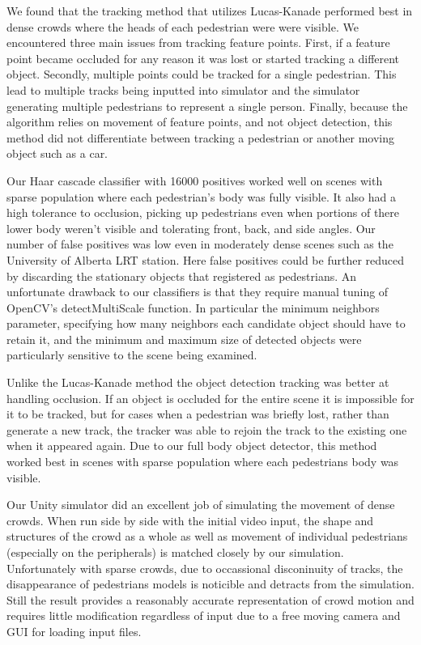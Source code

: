 \documentclass[12pt, onecolumn, conference]{IEEEtran}
\begin{document}
We found that the tracking method that utilizes Lucas-Kanade performed best in dense crowds where the heads of each pedestrian were were visible. We encountered three main issues from tracking feature points. First, if a feature point became occluded for any reason it was lost or started tracking a different object. Secondly, multiple points could be tracked for a single pedestrian. This lead to multiple tracks being inputted into simulator and the simulator generating multiple pedestrians to represent a single person. Finally, because the algorithm relies on movement of feature points, and not object detection, this method did not differentiate between tracking a pedestrian or  another moving object such as a car.

Our Haar cascade classifier with 16000 positives worked well on scenes with sparse population where each pedestrian's body was fully visible. It also had a high tolerance to occlusion, picking up pedestrians even when portions of there lower body weren't visible and tolerating front, back, and side angles. Our number of false positives was low even in moderately dense scenes such as the University of Alberta LRT station. Here false positives could be further reduced by discarding the stationary objects that registered as pedestrians. An unfortunate drawback to our classifiers is that they require manual tuning of OpenCV's detectMultiScale function. In particular  the minimum neighbors parameter, specifying how many neighbors each candidate object should have to retain it, and the minimum and maximum size of detected objects were particularly sensitive to the scene being examined. 

Unlike the Lucas-Kanade method the object detection tracking was better at handling occlusion. If an object is occluded for the entire scene it is impossible for it to be tracked, but for cases when a pedestrian was briefly lost, rather than generate a new track, the tracker was able to rejoin the track to the existing one when it appeared again. Due to our full body object detector, this method worked best in scenes with sparse population where each pedestrians body was visible. 

Our Unity simulator did an excellent job of simulating the movement of dense crowds. When run side by side with the initial video input, the shape and structures of the crowd as a whole as well as movement of individual pedestrians (especially on the peripherals) is matched closely by our simulation. Unfortunately with sparse crowds, due to occassional disconinuity of tracks, the disappearance of pedestrians models is noticible and detracts from the simulation. Still the result provides a reasonably accurate representation of crowd motion and requires little modification regardless of input due to a free moving camera and GUI for loading input files.
\end{document}
